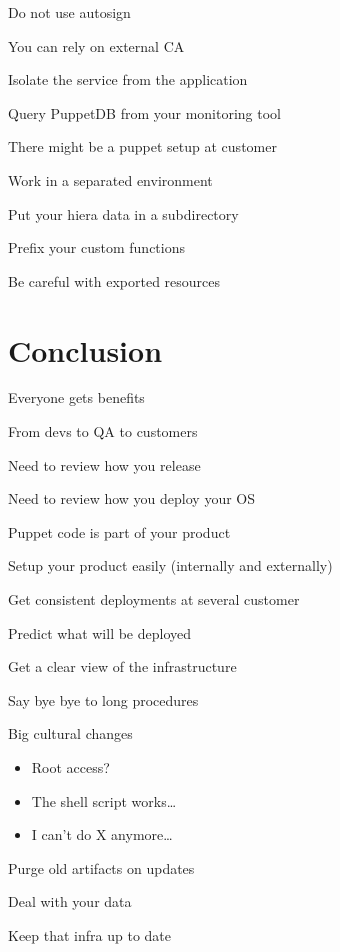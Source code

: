 \begin{iframe}
\item Do not use autosign
\item You can rely on external CA
\item Isolate the service from the application
\item Query PuppetDB from your monitoring tool
\end{iframe}



\begin{iframe}
\item There might be a puppet setup at customer
\item Work in a separated environment
\item Put your hiera data in a subdirectory
\item Prefix your custom functions
\item Be careful with exported resources
\end{iframe}

\section{Conclusion}


\begin{iframe}
\item Everyone gets benefits
\item From devs to QA to customers
\item Need to review how you release
\item Need to review how you deploy your OS
\item Puppet code is part of your product
\end{iframe}

\begin{iframe}[Advantages]
\item Setup your product easily (internally and externally)
\item Get consistent deployments at several customer
\item Predict what will be deployed
\item Get a clear view of the infrastructure
\item Say bye bye to long procedures
\end{iframe}

\begin{iframe}
\item Big cultural changes
    \begin{itemize}
        \item Root access?
        \item The shell script works\dots
        \item I can't do X anymore\dots
    \end{itemize}
\item Purge old artifacts on updates
\item Deal with your data
\item Keep that infra up to date
\end{iframe}

